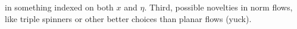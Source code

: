 \documentclass{article}
\begin{document}
in something indexed on both $x$ and $\eta$.  Third, possible novelties in norm flows, like triple spinners or other better choices than planar flows (yuck).

%  
%  
%

 
\end{document}
